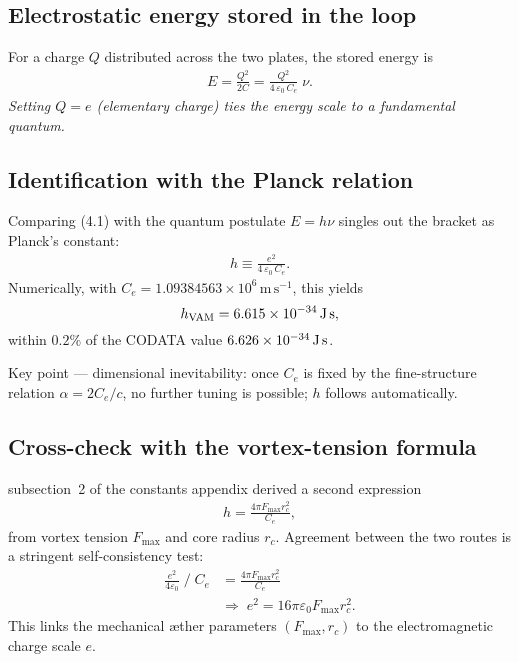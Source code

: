 \subsection{Electrostatic energy stored in the loop}

For a charge $Q$ distributed across the two plates, the stored energy is
\begin{align}
    E = \frac{Q^2}{2C}
      = \frac{Q^2}{4\,\varepsilon_0\,C_e}\;\nu.
    \tag{4.1}
\end{align}
\textit{Setting $Q=e$ (elementary charge) ties the energy scale to a fundamental quantum.}

\subsection{Identification with the Planck relation}

Comparing (4.1) with the quantum postulate $E = h\nu$ singles out the bracket as Planck’s constant:
\begin{align}
    h \equiv \frac{e^{2}}{4\,\varepsilon_0\,C_e}.
    \tag{5.1}
\end{align}
Numerically, with $C_e = 1.09384563\times10^{6}\,\text{m}\,\text{s}^{-1}$, this yields
\[
    h_{\text{VAM}} = 6.615\times10^{-34}\,\text{J\,s},
\]
within $0.2\%$ of the CODATA value $6.626\times10^{-34}\,\text{J\,s}$.

Key point --- dimensional inevitability: once $C_e$ is fixed by the fine-structure relation $\alpha = 2C_e/c$, no further tuning is possible; $h$ follows automatically.

\subsection{Cross-check with the vortex-tension formula}

subsection~2 of the constants appendix derived a second expression
\begin{align}
    h = \frac{4\pi F_{\max} r_c^{2}}{C_e},
\end{align}
from vortex tension $F_{\max}$ and core radius $r_c$. Agreement between the two routes is a stringent self-consistency test:
\begin{align*}
    \frac{e^{2}}{4\varepsilon_0}\;\big/\;C_e
    &= \frac{4\pi F_{\max} r_c^{2}}{C_e} \\
    &\Longrightarrow\;
    e^{2} = 16\pi\varepsilon_0 F_{\max} r_c^{2}.
\end{align*}
This links the mechanical æther parameters $(F_{\max}, r_c)$ to the electromagnetic charge scale $e$.

